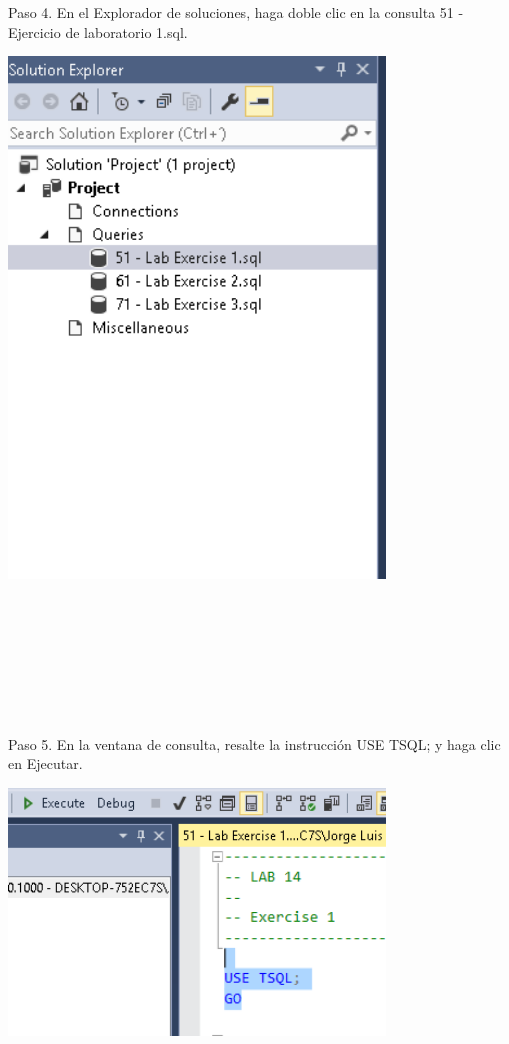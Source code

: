 \begin{flushleft}
Paso 4. En el Explorador de soluciones, haga doble clic en la consulta 51 - Ejercicio de laboratorio 1.sql.
\begin{center}
	\includegraphics[width=10cm]{./Imagenes/img4} 
	\end{center}
\textbf{}\\
\textbf{}\\
\textbf{}\\
\textbf{}\\
\textbf{}\\
\textbf{}\\
\textbf{}\\
Paso 5. En la ventana de consulta, resalte la instrucción USE TSQL; y haga clic en Ejecutar.
\begin{center}
	\includegraphics[width=10cm]{./Imagenes/img5} 
	\end{center}


\end{flushleft}
